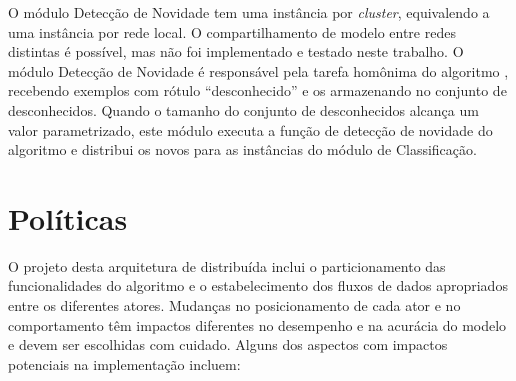 O módulo Detecção de Novidade tem uma instância por \emph{cluster}, equivalendo a uma
instância por rede local.
O compartilhamento de modelo entre redes distintas é possível, mas não foi
implementado e testado neste trabalho.
% 
O módulo Detecção de Novidade é responsável pela tarefa homônima do algoritmo
\minas, recebendo exemplos com rótulo ``desconhecido'' e os armazenando no
conjunto de desconhecidos.
Quando o tamanho do conjunto de desconhecidos alcança um valor parametrizado,
este módulo executa a função de detecção de novidade do algoritmo \minas
e distribui os novos \mclusters para as instâncias do módulo de Classificação.

\section{Políticas}\label{sec:polices}

O projeto desta arquitetura de \nd distribuída inclui o particionamento das
funcionalidades do algoritmo \minas e o estabelecimento dos fluxos de dados apropriados
entre os diferentes atores.
Mudanças no posicionamento de cada ator e no comportamento têm impactos
diferentes no desempenho e na acurácia do modelo e devem ser escolhidas com
cuidado.
% 
Alguns dos aspectos com impactos potenciais na implementação incluem:

